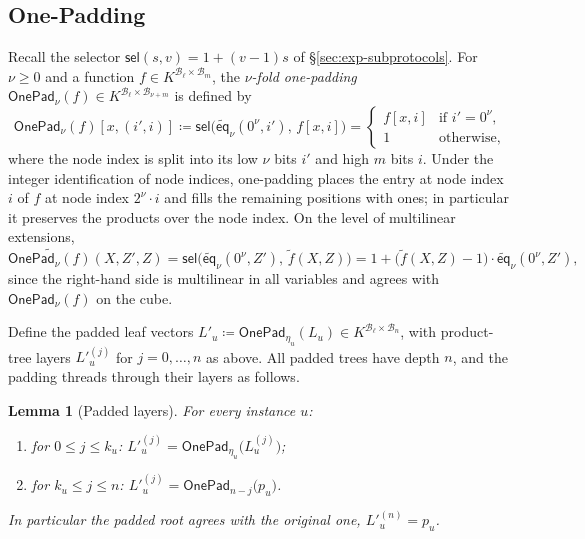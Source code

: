 \documentclass{article}
\newtheorem{lemma}[theorem]{Lemma}
\theoremstyle{definition}
\newcommand*{\mle}{\widetilde}
\newcommand{\eq}{\mathsf{eq}}
\newcommand{\BB}{\mathcal{B}}
\newcommand{\sel}{\textsf{sel}}
\begin{document}
\subsection{One-Padding}
\label{app:one-padding}

Recall the selector $\sel(s, v) = 1 + (v - 1) s$ of \S\ref{sec:exp-subprotocols}. For $\nu \geq 0$ and a function $f \in K^{\BB_\ell \times \BB_m}$, the \emph{$\nu$-fold one-padding} $\textsf{OnePad}_\nu(f) \in K^{\BB_\ell \times \BB_{\nu + m}}$ is defined by
\[
  \textsf{OnePad}_\nu(f)[x, (i', i)] \coloneqq \sel\bigl( \mle{\eq}_\nu(0^\nu, i'),\, f[x, i] \bigr) = \begin{cases} f[x, i] & \text{if } i' = 0^\nu, \\ 1 & \text{otherwise}, \end{cases}
\]
where the node index is split into its low $\nu$ bits $i'$ and high $m$ bits $i$. Under the integer identification of node indices, one-padding places the entry at node index $i$ of $f$ at node index $2^\nu \cdot i$ and fills the remaining positions with ones; in particular it preserves the products over the node index. On the level of multilinear extensions,
\begin{equation}
  \mle{\textsf{OnePad}_\nu(f)}(X, Z', Z) = \sel\bigl( \mle{\eq}_\nu(0^\nu, Z'),\, \mle{f}(X, Z) \bigr) = 1 + \bigl( \mle{f}(X, Z) - 1 \bigr) \cdot \mle{\eq}_\nu(0^\nu, Z'),
  \label{eq:onepad-mle}
\end{equation}
since the right-hand side is multilinear in all variables and agrees with $\textsf{OnePad}_\nu(f)$ on the cube.

Define the padded leaf vectors $L'_u \coloneqq \textsf{OnePad}_{\eta_u}(L_u) \in K^{\BB_\ell \times \BB_n}$, with product-tree layers $L'^{(j)}_u$ for $j = 0, \ldots, n$ as above. All padded trees have depth $n$, and the padding threads through their layers as follows.

\begin{lemma}[Padded layers]
\label{lem:padded-layers}
For every instance $u$:
\begin{enumerate}
\item for $0 \leq j \leq k_u$: \quad $L'^{(j)}_u = \textsf{OnePad}_{\eta_u}\bigl( L^{(j)}_u \bigr)$;
\item for $k_u \leq j \leq n$: \quad $L'^{(j)}_u = \textsf{OnePad}_{n - j}\bigl( p_u \bigr)$.
\end{enumerate}
In particular the padded root agrees with the original one, $L'^{(n)}_u = p_u$.
\end{lemma}
\end{document}
